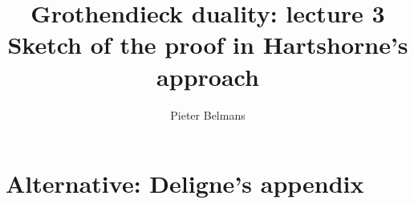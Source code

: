 \documentclass[10pt,a4paper]{article}
\title{Grothendieck duality: lecture 3 \\[.2em] \Large Sketch of the proof in Hartshorne's approach}
\author{Pieter Belmans}
\begin{document}
\maketitle

\begin{abstract}
  
\end{abstract}

\section{Alternative: Deligne's appendix}
\label{section:deligne}

\tableofcontents

\printbibliography
\end{document}
